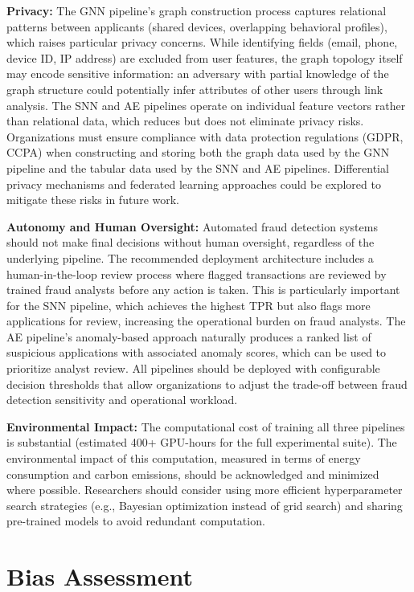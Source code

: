 \textbf{Privacy:} The GNN pipeline's graph construction process captures relational patterns between applicants (shared devices, overlapping behavioral profiles), which raises particular privacy concerns. While identifying fields (email, phone, device ID, IP address) are excluded from user features, the graph topology itself may encode sensitive information: an adversary with partial knowledge of the graph structure could potentially infer attributes of other users through link analysis. The SNN and AE pipelines operate on individual feature vectors rather than relational data, which reduces but does not eliminate privacy risks. Organizations must ensure compliance with data protection regulations (GDPR, CCPA) when constructing and storing both the graph data used by the GNN pipeline and the tabular data used by the SNN and AE pipelines. Differential privacy mechanisms and federated learning approaches could be explored to mitigate these risks in future work.

\textbf{Autonomy and Human Oversight:} Automated fraud detection systems should not make final decisions without human oversight, regardless of the underlying pipeline. The recommended deployment architecture includes a human-in-the-loop review process where flagged transactions are reviewed by trained fraud analysts before any action is taken. This is particularly important for the SNN pipeline, which achieves the highest TPR but also flags more applications for review, increasing the operational burden on fraud analysts. The AE pipeline's anomaly-based approach naturally produces a ranked list of suspicious applications with associated anomaly scores, which can be used to prioritize analyst review. All pipelines should be deployed with configurable decision thresholds that allow organizations to adjust the trade-off between fraud detection sensitivity and operational workload.

\textbf{Environmental Impact:} The computational cost of training all three pipelines is substantial (estimated 400+ GPU-hours for the full experimental suite). The environmental impact of this computation, measured in terms of energy consumption and carbon emissions, should be acknowledged and minimized where possible. Researchers should consider using more efficient hyperparameter search strategies (e.g., Bayesian optimization instead of grid search) and sharing pre-trained models to avoid redundant computation.

\section{Bias Assessment}

